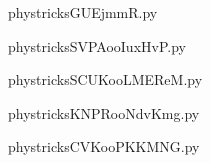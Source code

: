    

    \clearpage
    


    \newcommand{\CaptionFigGUEjmmR}{<+Type your caption here+>}
    \begin{center}
        
    \end{center}
    phystricksGUEjmmR.py

    

    \clearpage
    


    \newcommand{\CaptionFigSVPAooIuxHvP}{<+Type your caption here+>}
    \begin{center}
        
    \end{center}
    phystricksSVPAooIuxHvP.py

    

    \clearpage
    


    \newcommand{\CaptionFigSCUKooLMEReM}{<+Type your caption here+>}
    \begin{center}
        
    \end{center}
    phystricksSCUKooLMEReM.py

    

    \clearpage
    


    \newcommand{\CaptionFigKNPRooNdvKmg}{<+Type your caption here+>}
    \begin{center}
        
    \end{center}
    phystricksKNPRooNdvKmg.py

    

    \clearpage
    


    \newcommand{\CaptionFigCVKooPKKMNG}{<+Type your caption here+>}
    \begin{center}
        
    \end{center}
    phystricksCVKooPKKMNG.py

    

    \clearpage
    


